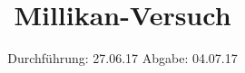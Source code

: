 

\subject{V503}
\title{Millikan-Versuch}
\date{
  Durchführung: 27.06.17
  \hspace{3em}
  Abgabe: 04.07.17
}



\maketitle
\thispagestyle{empty}
\tableofcontents
\newpage
\setcounter{page}{1}





\printbibliography


